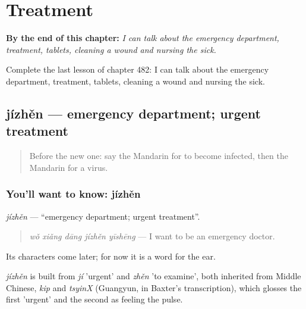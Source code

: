 
\chapter{Treatment}
\label{ch:zh-treatment}

\begin{chapteropening}
\textbf{By the end of this chapter:} \emph{I can talk about the emergency department, treatment, tablets, cleaning a wound and nursing the sick.}

Complete the last lesson of chapter 482: I can talk about the emergency department, treatment, tablets, cleaning a wound and nursing the sick.
\end{chapteropening}

\section[jízhěn]{jízhěn — emergency department; urgent treatment}

\label{lesson:ZH-C482-jizhen}



\begin{quote}
Before the new one: say the Mandarin for to become infected, then the Mandarin for a virus.
\end{quote}

\subsection*{You'll want to know: jízhěn}
\emph{jízhěn} — \textquotedblleft{}emergency department; urgent treatment\textquotedblright{}.

\begin{quote}
\emph{wǒ xiǎng dāng jízhěn yīshēng} — I want to be an emergency doctor.
\end{quote}

Its characters come later; for now it is a word for the ear.

\begin{cousinweb}
\emph{jízhěn} is built from \emph{jí} 'urgent' and \emph{zhěn} 'to examine', both inherited from Middle Chinese, \emph{kip} and \emph{tsyinX} (Guangyun, in Baxter's transcription), which glosses the first 'urgent' and the second as feeling the pulse.
\end{cousinweb}

